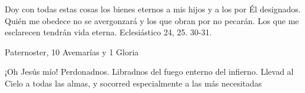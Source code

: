 \documentclass[a4paper,11pt, oneside]{report}
\begin{document}
        \smallskip
        Doy con todas estas cosas los bienes eternos a mis hijos y a los por Él designados. Quién me obedece no se avergonzará y los que obran por
        no pecarán. Los que me esclarecen tendrán vida eterna. Eclesiástico 24, 25. 30-31\cite{bover-cantera}.

        \smallskip
         Paternoster, 10 Avemarías y 1 Gloria
        
        \smallskip
        ¡Oh Jesús mío! Perdonadnos. Libradnos del fuego enterno del infierno. Llevad al Cielo a todas las almas, y socorred especialmente a las más 
        necesitadas

  \printbibliography{}
\end{document}
